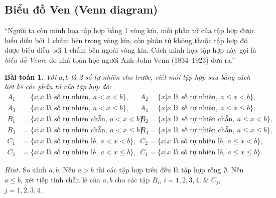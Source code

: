 \documentclass[oneside]{book}
\numberwithin{equation}{section}
\newtheorem{baitoan}{Bài toán}[section]
\begin{document}
\subsection{Biểu đồ Ven (Venn diagram)}
``Người ta còn minh họa tập hợp bằng 1 vòng kín, mỗi phần tử của tập hợp được biểu diễn bởi 1 chấm bên trong vòng kín, còn phần tử không thuộc tập hợp đó được biểu diễn bởi 1 chấm bên ngoài vòng kín. Cách minh họa tập hợp này gọi là \textit{biểu đồ Venn}, do nhà toán học người Anh John Venn (1834--1923) đưa ra.'' -- \cite[p. 8]{Thai_Anh_Dat_Ha_Loan_Nam_Quang_Toan_6_tap_1}

\begin{baitoan}
	Với $a,b$ là 2 số tự nhiên cho trước, viết mỗi tập hợp sau bằng cách liệt kê các phần tử của tập hợp đó:
	\begin{align*}
		A_1 &= \{x|x\mbox{ là số tự nhiên},\ a < x < b\},\ &&A_2 = \{x|x\mbox{ là số tự nhiên},\ a\le x < b\},\\
		A_3 &= \{x|x\mbox{ là số tự nhiên},\ a < x\le b\},\ &&A_4 = \{x|x\mbox{ là số tự nhiên},\ a\le x\le b\},\\
		B_1 &= \{x|x\mbox{ là số tự nhiên chẵn},\ a < x < b\},\ &&B_2 = \{x|x\mbox{ là số tự nhiên chẵn},\ a\le x < b\},\\
		B_3 &= \{x|x\mbox{ là số tự nhiên chẵn},\ a < x\le b\},\ &&B_4 = \{x|x\mbox{ là số tự nhiên chẵn},\ a\le x\le b\},\\
		C_1 &= \{x|x\mbox{ là số tự nhiên lẻ},\ a < x < b\},\ &&C_2 = \{x|x\mbox{ là số tự nhiên lẻ},\ a\le x < b\},\\ C_3 &= \{x|x\mbox{ là số tự nhiên lẻ},\ a < x\le b\},\ &&C_4 = \{x|x\mbox{ là số tự nhiên lẻ},\ a\le x\le b\}.
	\end{align*}
\end{baitoan}
\textit{Hint.} So sánh $a,b$. Nếu $a > b$ thì các tập hợp trên đều là tập hợp rỗng $\emptyset$. Nếu $a\le b$, xét tiếp tính chẵn lẻ của $a,b$ cho các tập $B_i$, $i = 1,2,3,4$, \& $C_j$, $j = 1,2,3,4$.
\end{document}
